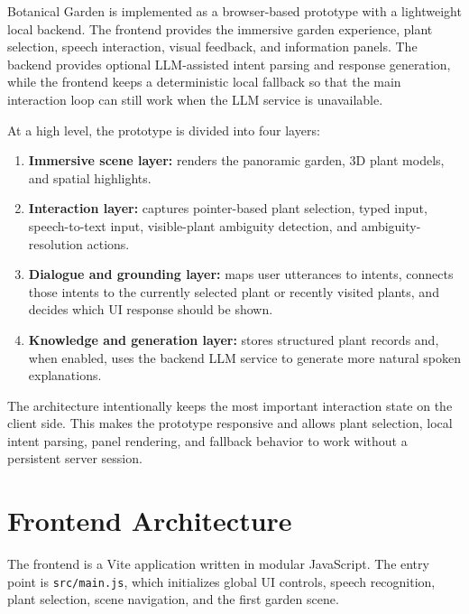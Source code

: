 \documentclass[12pt,a4paper]{article}
\begin{document}
Botanical Garden is implemented as a browser-based prototype with a lightweight local
backend. The frontend provides the immersive garden experience, plant
selection, speech interaction, visual feedback, and information panels. The
backend provides optional LLM-assisted intent parsing and response generation,
while the frontend keeps a deterministic local fallback so that the main
interaction loop can still work when the LLM service is unavailable.

At a high level, the prototype is divided into four layers:

\begin{enumerate}[label=\arabic*.]

    \item \textbf{Immersive scene layer:} renders the panoramic garden, 3D plant
    models, and spatial highlights.

    \item \textbf{Interaction layer:} captures pointer-based plant selection,
    typed input, speech-to-text input, visible-plant ambiguity detection, and
    ambiguity-resolution actions.

    \item \textbf{Dialogue and grounding layer:} maps user utterances to intents,
    connects those intents to the currently selected plant or recently visited
    plants, and decides which UI response should be shown.

    \item \textbf{Knowledge and generation layer:} stores structured plant
    records and, when enabled, uses the backend LLM service to generate more
    natural spoken explanations.
\end{enumerate}

The architecture intentionally keeps the most important interaction state on
the client side. This makes the prototype responsive and allows plant
selection, local intent parsing, panel rendering, and fallback behavior to work
without a persistent server session.

\section{Frontend Architecture}

The frontend is a Vite application written in modular JavaScript. The entry
point is \texttt{src/main.js}, which initializes global UI controls, speech
recognition, plant selection, scene navigation, and the first garden scene.
\end{document}
